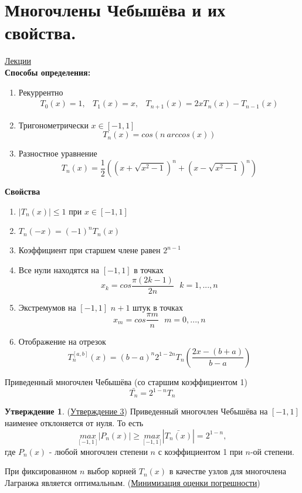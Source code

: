 \documentclass[specialist, subf, href, colorlinks=true, 12pt, times, mtpro, final]{disser}
\theoremstyle{definition}
\newtheorem{state}{Утверждение}[section]
\begin{document}
\section {Многочлены Чебышёва и их свойства.}
	\hyperlink {lects.18}{Лекции}\\
	\textbf{Способы определения:}
	\begin{enumerate}
		\item Рекуррентно 
			  $$
			  	\begin{array}{lcr}
			  		T_0(x) = 1, & T_1(x) = x, & T_{n+1}(x) = 2xT_n(x) - T_{n-1}(x)
			  	\end{array}
			  $$
		\item Тригонометрически $x\in[-1,1]$
			  $$
			  	T_n(x) = cos(n \ arccos(x))
			  $$
		\item Разностное уравнение
			  $$
			  	T_n(x) = \frac{1}{2}\left( \left( x + \sqrt{x^2 - 1} \right)^n + \left( x - \sqrt{x^2 - 1} \right)^n \right)
			  $$
	\end{enumerate}
	\textbf{Свойства}
	\begin{enumerate}
		\item $|T_n(x)| \le 1$ при $x \in [-1,1]$
		\item $T_n(-x) = (-1)^nT_n(x)$
		\item Коэффициент при старшем члене равен $2^{n - 1}$
		\item Все нули находятся на $[-1,1]$ в точках
			$$
				x_k = cos \frac{\pi (2k -1)}{2n} \ \ \ k = 1, ... , n
			$$
		\item Экстремумов на $[-1,1]$ $n+1$ штук в точках
			$$
				x_m = cos \frac{\pi m}{n} \ \ \ m = 0, ... , n
			$$ 
		\item Отображение на отрезок 
			$$
				T_n^{[a,b]} (x) = (b - a)^n 2^{1-2n} T_n \left( \frac{2x - (b+a)}{b-a} \right)
			$$
	\end{enumerate}

	Приведенный многочлен Чебышёва (со старшим коэффициентом 1)
	$$
		\bar {T_n} = 2^{1 - n}T_n
	$$
	
	\begin{state} (\hyperlink {lects.19}{Утверждение 3})
		Приведенный многочлен Чебышёва на $[-1,1]$ наименее отклоняется от нуля. То есть 
		$$
			\underset{[-1,1]}{max}|P_n(x)| \ge \underset{[-1,1]}{max} |\bar{T_n(x)}| = 2^{1-n},
		$$
		где $P_n(x)$ - любой многочлен степени $n$ с коэффициентом 1 при $n$-ой степени.
	\end{state}

	При фиксированном $n$ выбор корней $T_n(x)$ в качестве узлов для многочлена Лагранжа является оптимальным.
	(\hyperlink {lects.20}{Минимизация оценки погрешности})
\end{document}
